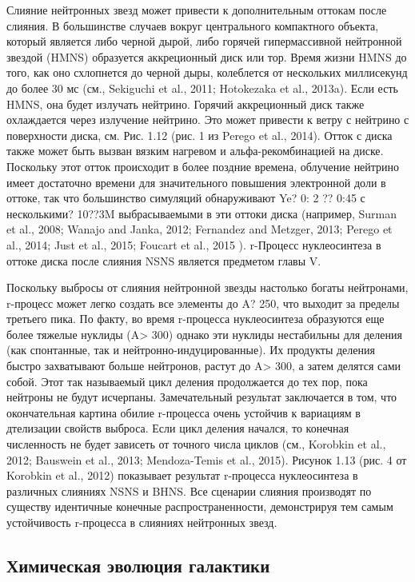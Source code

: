 \documentclass[%
bachelor,    %
natbib,      %
subf,        %
href,        %
colorlinks,  %
]{disser}
\begin{document}
Слияние нейтронных звезд может привести к дополнительным оттокам после слияния. В большинстве случаев вокруг центрального компактного объекта, который является либо черной дырой, либо горячей гипермассивной нейтронной звездой (HMNS) образуется аккреционный диск или тор. Время жизни HMNS до того, как оно схлопнется до черной дыры, колеблется от нескольких миллисекунд до более 30 мс (см., Sekiguchi et al., 2011; Hotokezaka et al., 2013a). Если есть HMNS, она будет излучать нейтрино. Горячий аккреционный диск также охлаждается через излучение нейтрино. Это может привести к ветру с нейтрино с поверхности диска, см. Рис. 1.12 (рис. 1 из Perego et al., 2014). Отток с диска также может быть вызван вязким нагревом и альфа-рекомбинацией на диске. Поскольку этот отток происходит в более поздние времена, облучение нейтрино имеет достаточно времени для значительного повышения электронной доли в оттоке, так что большинство симуляций обнаруживают Ye? 0: 2 ?? 0:45 с несколькими? 10??3M выбрасываемыми в эти оттоки диска (например, Surman et al., 2008; Wanajo and Janka, 2012; Fernandez and Metzger, 2013; Perego et al., 2014; Just et al., 2015; Foucart et al., 2015 ). r-Процесс нуклеосинтеза в оттоке диска после слияния NSNS является предметом главы V.

Поскольку выбросы от слияния нейтронной звезды настолько богаты нейтронами,  r-процесс может легко создать все элементы до A? 250, что выходит за пределы третьего пика. По факту, во время r-процесса нуклеосинтеза образуются еще более тяжелые нуклиды (A> 300) однако эти нуклиды нестабильны для деления (как спонтанные, так и нейтронно-индуцированные). Их продукты деления быстро захватывают больше нейтронов, растут до A> 300, а затем делятся сами собой. Этот так называемый цикл деления продолжается до тех пор, пока нейтроны не будут исчерпаны. Замечательный результат заключается в том, что окончательная картина обилие r-процесса очень устойчив к вариациям в дтелизации свойств выброса. Если цикл деления начался, то конечная численность не будет зависеть от точного числа циклов (см., Korobkin et al., 2012; Bauswein et al., 2013; Mendoza-Temis et al., 2015). Рисунок 1.13 (рис. 4 от Korobkin et al., 2012) показывает результат r-процесса нуклеосинтеза в различных слияниях NSNS и BHNS. Все сценарии слияния производят по существу идентичные конечные распространенности, демонстрируя тем самым устойчивость r-процесса в слияниях нейтронных звезд.

\subsection{Химическая эволюция галактики}
\end{document}
